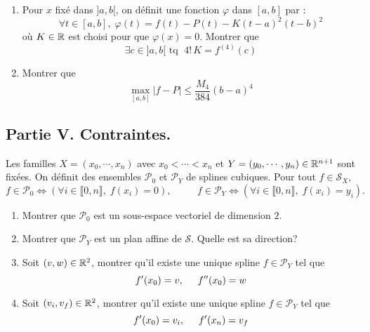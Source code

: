 \begin{enumerate}
\begin{enumerate}
  \item Pour $x$ fixé dans $]a,b[$, on définit une fonction $\varphi$ dans $[a,b]$ par :
\begin{displaymath}
  \forall t\in [a,b], \; \varphi(t) = f(t) - P(t) - K(t-a)^2(t-b)^2
\end{displaymath}
où $K\in \mathbb{R}$ est choisi pour que $\varphi(x) = 0$. Montrer que 
\begin{displaymath}
  \exists c\in ]a,b[\text{ tq }\; 4!\, K = f^{(4)}(c)
\end{displaymath}

  \item Montrer que 
\begin{displaymath}
  \max_{[a,b]}\left|f -P\right| \leq \frac{M_4}{384}(b-a)^4
\end{displaymath}
\end{enumerate}

\end{enumerate}

\subsection*{Partie V. Contraintes.}
Les familles $X=(x_0,\cdots,x_n)$ avec $x_0< \cdots < x_n$ et $Y = (y_0,\cdots,y_n) \in \mathbb{R}^{n+1}$ sont fixées. On  définit des ensembles $\mathcal{P}_0$ et $\mathcal{P}_Y$ de splines cubiques. Pour tout $f\in \mathcal{S}_X$,
\begin{displaymath}
 f\in \mathcal{P}_0 \Leftrightarrow \left( \forall i \in \llbracket 0,n\rrbracket, \; f(x_i) = 0 \right), \hspace{1cm}\
 f\in \mathcal{P}_Y \Leftrightarrow \left( \forall i \in \llbracket 0,n\rrbracket, \; f(x_i) = y_i \right). 
\end{displaymath}

\begin{enumerate}
\item Montrer que $\mathcal{P}_0$ est un sous-espace vectoriel de dimension $2$.

\item Montrer que $\mathcal{P}_Y$ est un plan affine de $\mathcal{S}$. Quelle est sa direction?

\item Soit $(v,w)\in \mathbb{R}^2$, montrer qu'il existe une unique spline $f\in \mathcal{P}_Y$ tel que 
\begin{displaymath}
  f'(x_0) = v, \hspace{0.5cm} f''(x_0) = w
\end{displaymath}

\item Soit $(v_i,v_f)\in \mathbb{R}^2$, montrer qu'il existe une unique spline $f\in \mathcal{P}_Y$ tel que 
\begin{displaymath}
  f'(x_0) = v_i, \hspace{0.5cm} f'(x_n) = v_f
\end{displaymath}
\end{enumerate}
